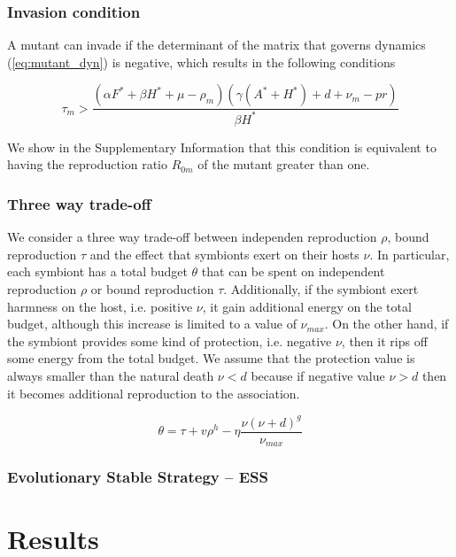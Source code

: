 \documentclass[11pt]{article}
\begin{document}
\subsubsection*{Invasion condition}
A mutant can invade if the determinant of the matrix that governs dynamics (\ref{eq:mutant_dyn}) is negative, which results in the following conditions

\begin{equation}
	\tau_m > \frac{(\alpha  F^* + \beta  H^* + \mu  - \rho_m) (\gamma  (A^* + H^*) + d + \nu_m - p r)}{\beta  H^*}
\end{equation}

We show in the Supplementary Information that this condition is equivalent to having the reproduction ratio $R_{0m}$ of the mutant greater than one.

\subsubsection*{Three way trade-off}
We consider a three way trade-off between independen reproduction $\rho$, bound reproduction $\tau$ and the effect that symbionts exert on their hosts $\nu$. In particular, each symbiont has a total budget $\theta$ that can be spent on independent reproduction $\rho$ or bound reproduction $\tau$. Additionally, if the symbiont exert harmness on the host, i.e. positive $\nu$, it gain additional energy on the total budget, although this increase is limited to a value of $\nu_{max}$. On the other hand, if the symbiont provides some kind of protection, i.e. negative $\nu$, then it rips off some energy from the total budget. We assume that the protection value is always smaller than the natural death $\nu < d$ because if negative value $\nu > d$ then it becomes additional reproduction to the association. 

\begin{equation}
	\theta = \tau + v \rho^h -  \eta \frac{\nu (\nu + d)^g}{\nu_{max}}
\end{equation}

\subsubsection*{Evolutionary Stable Strategy -- ESS}


\section*{Results}
\end{document}
